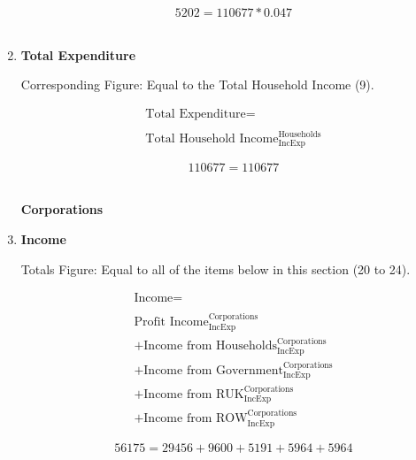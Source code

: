 \begin{enumerate}
\begin{equation} \nonumber
5202 = 110677*0.047
\end{equation}\\


\item \textbf {Total Expenditure}

Corresponding Figure: Equal to the Total Household Income (9).

\begin{equation}
\begin{split}
\text{Total Expenditure} =  \\ \\
\text{Total Household Income}^\text{Households}_\text{IncExp}
\end{split} \label{eq:2.5.21}
\end{equation}

\begin{equation} \nonumber
110677 = 110677
\end{equation}\\



\pagebreak

\begin{center}
\textbf{\LARGE Corporations}
\end{center}

\item \textbf {Income}

Totals Figure: Equal to all of the items below in this section (20 to 24).

\begin{equation}
\begin{split}
\text{Income} =  \\ \\
\text{Profit Income}^\text{Corporations}_\text{IncExp}\\
+\text{Income from Households}^\text{Corporations}_\text{IncExp}\\
+\text{Income from Government}^\text{Corporations}_\text{IncExp}\\
+\text{Income from RUK}^\text{Corporations}_\text{IncExp}\\
+\text{Income from ROW}^\text{Corporations}_\text{IncExp}
\end{split} \label{eq:2.5.22}
\end{equation}

\begin{equation} \nonumber
56175 = 29456+9600+5191+5964+5964
\end{equation}\\


\end{enumerate}
